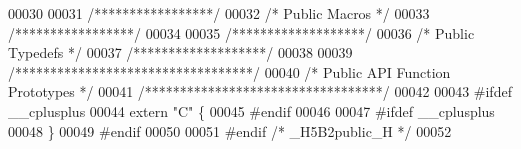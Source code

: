\begin{DoxyCode}
00030 
00031 \textcolor{comment}{/*****************/}
00032 \textcolor{comment}{/* Public Macros */}
00033 \textcolor{comment}{/*****************/}
00034 
00035 \textcolor{comment}{/*******************/}
00036 \textcolor{comment}{/* Public Typedefs */}
00037 \textcolor{comment}{/*******************/}
00038 
00039 \textcolor{comment}{/**********************************/}
00040 \textcolor{comment}{/* Public API Function Prototypes */}
00041 \textcolor{comment}{/**********************************/}
00042 
00043 \textcolor{preprocessor}{#ifdef \_\_cplusplus}
00044 \textcolor{keyword}{extern} \textcolor{stringliteral}{"C"} \{
00045 \textcolor{preprocessor}{#endif}
00046 
00047 \textcolor{preprocessor}{#ifdef \_\_cplusplus}
00048 \}
00049 \textcolor{preprocessor}{#endif}
00050 
00051 \textcolor{preprocessor}{#endif }\textcolor{comment}{/* \_H5B2public\_H */}\textcolor{preprocessor}{}
00052 
\end{DoxyCode}
